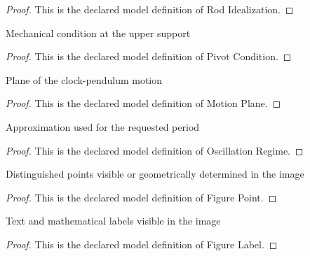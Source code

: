 \begin{proof}
  This is the declared model definition of Rod Idealization.
\end{proof}
\begin{definition}
  \label{def:physics:phyx-mini-0276:phyxminiproblems-problemphyxmini0276-pivotcondition}
  Mechanical condition at the upper support
\end{definition}
\begin{proof}
  This is the declared model definition of Pivot Condition.
\end{proof}
\begin{definition}
  \label{def:physics:phyx-mini-0276:phyxminiproblems-problemphyxmini0276-motionplane}
  Plane of the clock-pendulum motion
\end{definition}
\begin{proof}
  This is the declared model definition of Motion Plane.
\end{proof}
\begin{definition}
  \label{def:physics:phyx-mini-0276:phyxminiproblems-problemphyxmini0276-oscillationregime}
  Approximation used for the requested period
\end{definition}
\begin{proof}
  This is the declared model definition of Oscillation Regime.
\end{proof}
\begin{definition}
  \label{def:physics:phyx-mini-0276:phyxminiproblems-problemphyxmini0276-figurepoint}
  Distinguished points visible or geometrically determined in the image
\end{definition}
\begin{proof}
  This is the declared model definition of Figure Point.
\end{proof}
\begin{definition}
  \label{def:physics:phyx-mini-0276:phyxminiproblems-problemphyxmini0276-figurelabel}
  Text and mathematical labels visible in the image
\end{definition}
\begin{proof}
  This is the declared model definition of Figure Label.
\end{proof}
